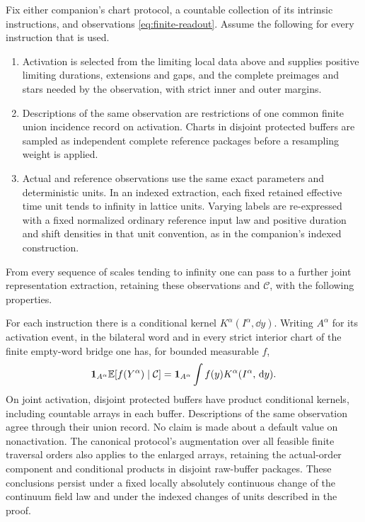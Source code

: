 \begin{proposition}
\label{prop:readout-extension}
Fix either companion's chart protocol, a countable collection of its
intrinsic instructions, and observations \eqref{eq:finite-readout}.
Assume the following for every instruction that is used.
\begin{enumerate}[label=(\roman*)]
\item Activation is selected from the limiting local data above and
supplies positive limiting durations, extensions and gaps, and the
complete preimages and stars needed by the observation, with strict
inner and outer margins.
\item Descriptions of the same observation are restrictions of one
common finite union incidence record on activation.  Charts in
disjoint protected buffers are sampled as independent complete
reference packages before a resampling weight is applied.
\item Actual and reference observations use the same exact parameters
and deterministic units.  In an indexed extraction, each fixed
retained effective time unit tends to infinity in lattice units.
Varying labels are re-expressed with a fixed normalized ordinary
reference input law and positive duration and shift densities in that
unit convention, as in the companion's indexed construction.
\end{enumerate}
From every sequence of scales tending to infinity one can pass to a further joint
representation extraction, retaining these observations and
\(\mathcal C\), with the following properties.

For each instruction there is a conditional kernel
\(K^\alpha(I^\alpha,\dd y)\).  Writing \(A^\alpha\) for its activation
event, in the bilateral word and in every strict interior chart of the
finite empty-word bridge one has, for bounded measurable \(f\),
\begin{equation}
 \mathbf 1_{A^\alpha}\mathbb E[f(Y^\alpha)\mid\mathcal C]
 =\mathbf 1_{A^\alpha}\int f(y)K^\alpha(I^\alpha,\,\mathrm d y).
 \label{eq:activated-kernel}
\end{equation}
On joint activation, disjoint protected buffers have
product conditional kernels, including countable arrays in each buffer.
Descriptions of the same observation agree through their union record.
No claim is made about a default value on nonactivation.  The canonical
protocol's augmentation over all feasible finite traversal orders also
applies to the enlarged arrays, retaining the actual-order component
and conditional products in disjoint raw-buffer packages.
These conclusions persist under a fixed
locally absolutely continuous change of the continuum field law and
under the indexed changes of units described in the proof.


\end{proposition}
